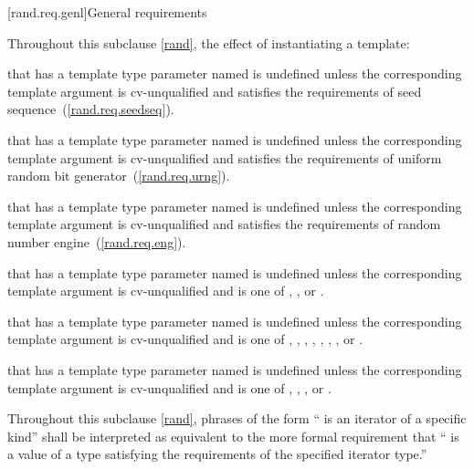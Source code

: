 [rand.req.genl]{General requirements}%

\pnum
Throughout this subclause \ref{rand},
the effect of instantiating a template:
\begin{enumeratea}
  \item
    that has a template type parameter
    named 
    is undefined unless the corresponding template argument
    is cv-unqualified and
    satisfies the requirements
    of seed sequence~(\ref{rand.req.seedseq}).
  \item
    that has a template type parameter
    named 
    is undefined unless the corresponding template argument
    is cv-unqualified and
    satisfies the requirements
    of uniform random bit generator~(\ref{rand.req.urng}).
  \item
    that has a template type parameter
    named 
    is undefined unless the corresponding template argument
    is cv-unqualified and
    satisfies the requirements
    of random number engine~(\ref{rand.req.eng}).
  \item
    that has a template type parameter
    named 
    is undefined unless the corresponding template argument
    is cv-unqualified and
    is one of
    , , or  .
  \item
    that has a template type parameter
    named 
    is undefined unless the corresponding template argument
    is cv-unqualified and
    is one of
      ,
      ,
      ,
       ,
       ,
       ,
       ,
      or
        .
  \item
    that has a template type parameter
    named 
    is undefined unless the corresponding template argument
    is cv-unqualified and
    is one of
       ,
       ,
       ,
      or
        .
\end{enumeratea}

\pnum
Throughout this subclause \ref{rand},
phrases of the form `` is an iterator of a specific kind''
shall be interpreted as equivalent to the more formal requirement that
`` is a value
of a type satisfying the requirements
of the specified iterator type.''

